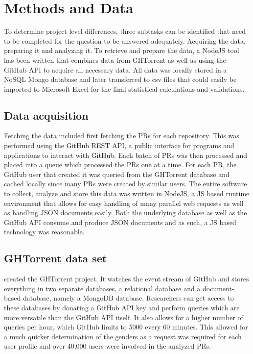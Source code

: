 \section{Methods and Data}

To determine project level differences, three subtasks can be identified that need to be completed for the question to be answered adequately. Acquiring the data, preparing it and analyzing it. To retrieve and prepare the data, a NodeJS tool has been written that combines data from GHTorrent as well as using the GitHub \ac{API} to acquire all necessary data. All data was locally stored in a NoSQL Mongo database and later transferred to \ac{csv} files that could easily be imported to Microsoft Excel for the final statistical calculations and validations.

\subsection{Data acquisition}

Fetching the data included first fetching the \ac{PR}s for each repository. This was performed using the GitHub REST \ac{API}, a public interface for programs and applications to interact with GitHub. Each batch of \ac{PR}s was then processed and placed into a queue which processed the \ac{PR}s one at a time. For each \ac{PR}, the GitHub user that created it was queried from the GHTorrent database and cached locally since many \ac{PR}s were created by similar users. The entire software to collect, analyze and store this data was written in NodeJS, a \ac{JS} based runtime environment that allows for easy handling of many parallel web requests as well as handling \ac{JSON} documents easily. Both the underlying database as well as the GitHub \ac{API} consume and produce \ac{JSON} documents and as such, a \ac{JS} based technology was reasonable.

\subsection{GHTorrent data set}

\citeauthor{Gousi13} created the GHTorrent project. It watches the event stream of GitHub and stores everything in two separate databases, a relational database and a document-based database, namely a MongoDB database. Researchers can get access to these databases by donating a GitHub \ac{API} key and perform queries which are more versatile than the GitHub \ac{API} itself. It also allows for a higher number of queries per hour, which GitHub limits to 5000 every 60 minutes. This allowed for a much quicker determination of the genders as a request was required for each user profile and over 40,000 users were involved in the analyzed \ac{PR}s.


